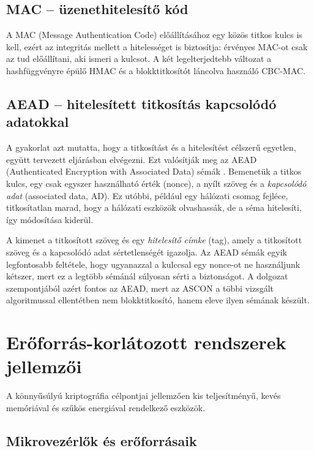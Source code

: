 \documentclass[a4paper,12pt]{report}
\theoremstyle{definition}
\theoremstyle{remark}
\begin{document}
\subsection{MAC -- üzenethitelesítő kód}

A MAC (Message Authentication Code) előállításához egy közös titkos kulcs is kell, ezért az integritás mellett a hitelességet is biztosítja: érvényes MAC-ot csak az tud előállítani, aki ismeri a kulcsot. A két legelterjedtebb változat a hashfüggvényre épülő HMAC \cite{Stallings2017} és a blokktitkosítót láncolva használó CBC-MAC.

\subsection{AEAD -- hitelesített titkosítás kapcsolódó adatokkal}\label{sec:aead}

A gyakorlat azt mutatta, hogy a titkosítást és a hitelesítést célszerű egyetlen, együtt tervezett eljárásban elvégezni. Ezt valósítják meg az AEAD (Authenticated Encryption with Associated Data) sémák \cite{Dobraunig2021}. Bemenetük a titkos kulcs, egy csak egyszer használható érték (nonce), a nyílt szöveg és a \emph{kapcsolódó adat} (associated data, AD). Ez utóbbi, például egy hálózati csomag fejléce, titkosítatlan marad, hogy a hálózati eszközök olvashassák, de a séma hitelesíti, így módosítása kiderül.

A kimenet a titkosított szöveg és egy \emph{hitelesítő címke} (tag), amely a titkosított szöveg és a kapcsolódó adat sértetlenségét igazolja. Az AEAD sémák egyik legfontosabb feltétele, hogy ugyanazzal a kulccsal egy nonce-ot ne használjunk kétszer, mert ez a legtöbb sémánál súlyosan sérti a biztonságot. A dolgozat szempontjából azért fontos az AEAD, mert az ASCON a többi vizsgált algoritmussal ellentétben nem blokktitkosító, hanem eleve ilyen sémának készült.

\section{Erőforrás-korlátozott rendszerek jellemzői}\label{sec:eroforras}

A könnyűsúlyú kriptográfia célpontjai jellemzően kis teljesítményű, kevés memóriával és szűkös energiával rendelkező eszközök.

\subsection{Mikrovezérlők és erőforrásaik}\label{sec:mikrovezerlok}
\end{document}
